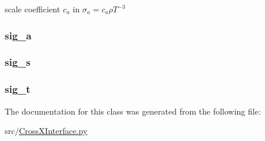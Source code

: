 scale coefficient $c_a$ in $\sigma_a = c_a \rho T^{-3}$ 

\hypertarget{classsrc_1_1_cross_x_interface_1_1_inv_cubed_cross_x_ab19871ffd067470950336cff88f8b1da}{
\subsubsection[{sig\-\_\-a}]{\setlength{\rightskip}{0pt plus 5cm}sig\-\_\-a}}\label{classsrc_1_1_cross_x_interface_1_1_inv_cubed_cross_x_ab19871ffd067470950336cff88f8b1da}
\hypertarget{classsrc_1_1_cross_x_interface_1_1_inv_cubed_cross_x_afb10e3cd4777a9b381a31a32071fc0d1}{
\subsubsection[{sig\-\_\-s}]{\setlength{\rightskip}{0pt plus 5cm}sig\-\_\-s}}\label{classsrc_1_1_cross_x_interface_1_1_inv_cubed_cross_x_afb10e3cd4777a9b381a31a32071fc0d1}
\hypertarget{classsrc_1_1_cross_x_interface_1_1_inv_cubed_cross_x_a9aa02ff48c273c3bc0a8213a045e6f4e}{
\subsubsection[{sig\-\_\-t}]{\setlength{\rightskip}{0pt plus 5cm}sig\-\_\-t}}\label{classsrc_1_1_cross_x_interface_1_1_inv_cubed_cross_x_a9aa02ff48c273c3bc0a8213a045e6f4e}


The documentation for this class was generated from the following file\-:\begin{DoxyCompactItemize}
\item 
src/\hyperlink{_cross_x_interface_8py}{Cross\-X\-Interface.\-py}\end{DoxyCompactItemize}
